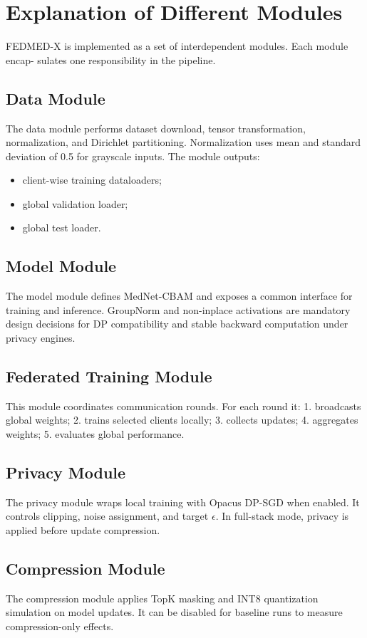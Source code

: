 \documentclass[12pt,a4paper]{report}
\begin{document}
\section{Explanation of Different Modules}
FEDMED-X is implemented as a set of interdependent modules. Each module encap- sulates one responsibility in the pipeline.
\subsection{Data Module}
The data module performs dataset download, tensor transformation, normalization, and Dirichlet partitioning. Normalization uses mean and standard deviation of 0.5 for grayscale inputs. The module outputs:
\begin{itemize}
\item client-wise training dataloaders;
\item global validation loader;
\item global test loader.
\end{itemize}
\subsection{Model Module}
The model module defines MedNet-CBAM and exposes a common interface for training and inference. GroupNorm and non-inplace activations are mandatory design decisions for DP compatibility and stable backward computation under privacy engines.
\subsection{Federated Training Module}
This module coordinates communication rounds. For each round it:
1. broadcasts global weights; 2. trains selected clients locally; 3. collects updates; 4. aggregates weights; 5. evaluates global performance.
\subsection{Privacy Module}
The privacy module wraps local training with Opacus DP-SGD when enabled.
It controls clipping, noise assignment, and target $\epsilon$. In full-stack mode, privacy is applied before update compression.
\subsection{Compression Module}
The compression module applies TopK masking and INT8 quantization simulation on model updates. It can be disabled for baseline runs to measure compression-only effects.
\end{document}
